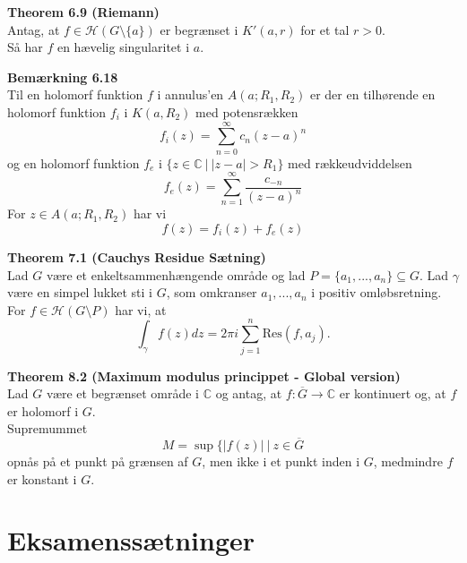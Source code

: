 \documentclass[10pt,a4paper]{article}
\theoremstyle{definition}
\begin{document}
\begin{framed}
\textbf{Theorem 6.9 (Riemann)} \\
Antag, at $f \in \mathcal{H}(G \setminus \{a\})$ er begrænset i $K'(a,r)$ for et tal $r>0$.  \\
Så har $f$ en hævelig singularitet i $a$.
\end{framed}

\begin{framed}
\textbf{Bemærkning 6.18} \\
Til en holomorf funktion $f$ i annulus'en $A(a; R_1, R_2)$ er der en tilhørende en holomorf funktion $f_i$ i $K(a,R_2)$ med potensrækken
$$f_i (z) = \sum\limits_{n=0}^\infty c_n (z-a)^n$$
og en holomorf funktion $f_e$ i $\{z \in \mathbb{C} \ | \ |z-a| > R_1\}$ med rækkeudviddelsen
$$f_e(z) = \sum\limits_{n=1}^\infty \frac{c_{-n}}{(z-a)^n}$$
For $z \in A(a;R_1,R_2)$ har vi
$$f(z) = f_i(z) + f_e(z)$$
\end{framed}

\begin{framed}
\textbf{Theorem 7.1 (Cauchys Residue Sætning)} \\
Lad $G$ være et enkeltsammenhængende område og lad $P=\{a_1,...,a_n\} \subseteq G$. Lad $\gamma$ være en simpel lukket sti i $G$, som omkranser $a_1,...,a_n$ i positiv omløbsretning. \\
For $f  \in \mathcal{H}(G \setminus P)$ har vi, at
$$\int_\gamma f(z)dz = 2 \pi i \sum\limits_{j=1}^n \text{Res}(f,a_j).$$
\end{framed}

\newpage
\begin{framed}
\textbf{Theorem 8.2 (Maximum modulus princippet - Global version)} \\
Lad $G$ være et begrænset område i $\mathbb{C}$ og antag, at $f: \overline{G} \rightarrow \mathbb{C}$ er kontinuert og, at $f$ er holomorf i $G$. \\ 
Supremummet
$$M= \sup\{|f(z)| \ | \ z\in \overline{G}$$
opnås på et punkt på grænsen af $G$, men ikke i et punkt inden i $G$, medmindre $f$ er konstant i $G$.
\end{framed}









\newpage
\section{Eksamenssætninger}
\end{document}
